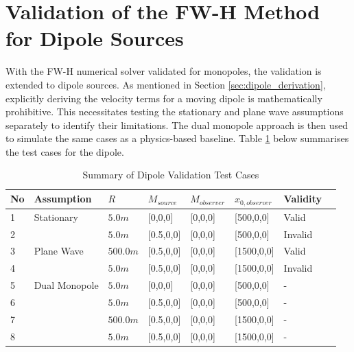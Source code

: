 
\section{Validation of the FW-H Method for Dipole Sources} \label{sec:dipole_validation}

With the FW-H numerical solver validated for monopoles, the validation is extended to dipole sources. As mentioned in Section \ref{sec:dipole_derivation}, explicitly deriving the velocity terms for a moving dipole is mathematically prohibitive. This necessitates testing the stationary and plane wave assumptions separately to identify their limitations. The dual monopole approach is then used to simulate the same cases as a physics-based baseline. Table \ref{tab:dipole_validation_test_case} below summarises the test cases for the dipole.

\begin{table}[H]
    \centering
    \caption{Summary of Dipole Validation Test Cases}
    \label{tab:dipole_validation_test_case}
    \begin{tabular}{p{1cm} p{4cm} p{1.8cm} p{1.8cm} p{1.8cm} p{2cm} p{1.5cm} l}
        \toprule
        \textbf{No} & \textbf{Assumption} & \textbf{$R$} & \textbf{$M_{source}$} & \textbf{$M_{observer}$} & \textbf{$x_{0,observer}$} & \textbf{Validity}\\
        \midrule
        1& Stationary & $5.0m$ & [0,0,0] & [0,0,0] & [500,0,0] & Valid \\
        2& & $5.0m$ & [0.5,0,0] & [0,0,0] & [500,0,0] & Invalid \\

        3& Plane Wave & $500.0m$ & [0.5,0,0] & [0,0,0] & [1500,0,0] & Valid \\
        4& & $5.0m$ & [0.5,0,0] & [0,0,0] & [1500,0,0] & Invalid \\
        
        5& Dual Monopole & $5.0m$ & [0,0,0] & [0,0,0] & [500,0,0] & - \\
        6& & $5.0m$ & [0.5,0,0] & [0,0,0] & [500,0,0] & - \\

        7& & $500.0m$ & [0.5,0,0] & [0,0,0] & [1500,0,0] & - \\
        8& & $5.0m$ & [0.5,0,0] & [0,0,0] & [1500,0,0] & - \\

        \bottomrule
    \end{tabular}
\end{table}

